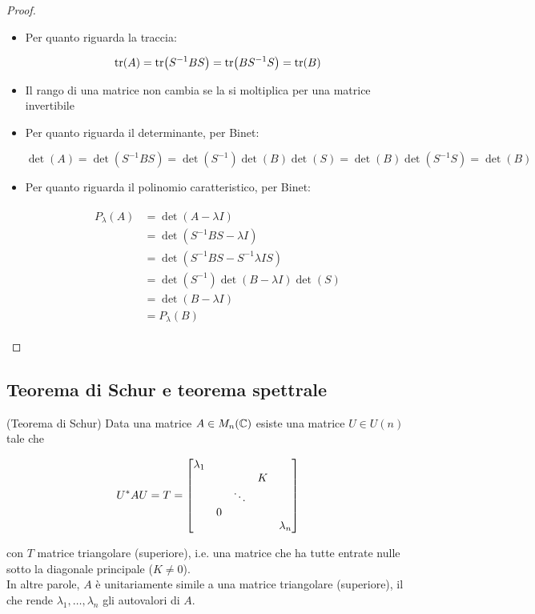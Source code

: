 \begin{proof}
	\begin{itemize}
		\item Per quanto riguarda la traccia:

		\begin{equation}
			\tr(A) = \tr(S^{-1} B S) = \tr(B S^{-1} S) = \tr(B)
		\end{equation}

		\item Il rango di una matrice non cambia se la si moltiplica per una matrice invertibile

		\item Per quanto riguarda il determinante, per Binet:

		\begin{equation}
			\det(A) = \det(S^{-1} B S) %
			= \det(S^{-1}) \det(B) \det(S) %
			= \det(B) \det(S^{-1} S) %
			= \det(B)
		\end{equation}

		\item Per quanto riguarda il polinomio caratteristico, per Binet:
		
		\begin{align}
			\begin{split}
				P_{\lambda}(A) &= \det(A - \lambda I) \\
				&= \det(S^{-1} B S - \lambda I) \\
				&= \det(S^{-1} B S - S^{-1} \lambda I S) \\
				&= \det(S^{-1}) \det(B - \lambda I) \det(S) \\
				&= \det(B - \lambda I) \\
				&= P_{\lambda}(B)
			\end{split}
		\end{align}
		
	\end{itemize}
\end{proof}

\subsection{Teorema di Schur e teorema spettrale}

\begin{theorem}(Teorema di Schur)
	Data una matrice $ A \in M_{n}(\mathbb{C}) $ esiste una matrice $ U \in U(n) $ tale che
	
	\begin{equation}
		U^{*} A U = T = %
		\bmqty{ %
				\dmat{ %
						\lambda_{1},
						& & K \\ & \ddots & \\ 0 & & ,
						\lambda_{n}
						}
				}
	\end{equation}

	con $ T $ matrice triangolare (superiore), i.e. una matrice che ha tutte entrate nulle sotto la diagonale principale ($ K \neq 0 $).\\
	In altre parole, $ A $ è unitariamente simile a una matrice triangolare (superiore), il che rende $ \lambda_{1},\dots,\lambda_{n} $ gli autovalori di $ A $.
\end{theorem}

